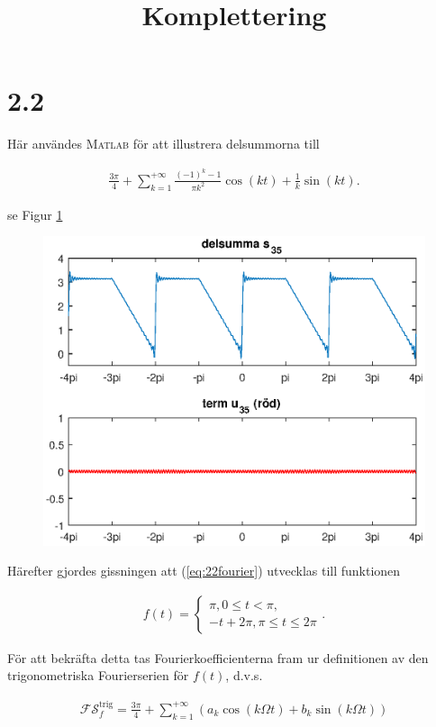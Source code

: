 \documentclass[a4paper]{article}
\title{Komplettering}
\begin{document}
\maketitle

\section*{2.2}

Här användes \textsc{Matlab} för att illustrera delsummorna till

\begin{align}
  \frac{3\pi}{4} + \sum_{k=1}^{+\infty}\frac{(-1)^k-1}{\pi k^2}\cos (kt) + \frac{1}{k}\sin (kt).\label{eq:22fourier}
\end{align}

se Figur \ref{fig:serie22}

\begin{figure}[h!]
  \centering
  \includegraphics[width=0.75\linewidth]{serie22.eps}
  \caption{}
  \label{fig:serie22}
\end{figure} 

\noindent Härefter gjordes gissningen att (\ref{eq:22fourier}) utvecklas till funktionen

\begin{align*}
  f(t) =
  \begin{cases}
    \pi, 0 \leq t < \pi,\\
    -t + 2\pi, \pi \leq t \leq 2\pi
  \end{cases}.
\end{align*}

För att bekräfta detta tas Fourierkoefficienterna fram ur definitionen av
den trigonometriska Fourierserien för $f(t)$, d.v.s.

\begin{align*}
  \mathcal{FS}_f^{\text{trig}} = \frac{3\pi}{4} + \sum_{k=1}^{+\infty}\left( a_k\cos(k\Omega t) + b_k\sin(k\Omega t) \right)
\end{align*}
\end{document}
